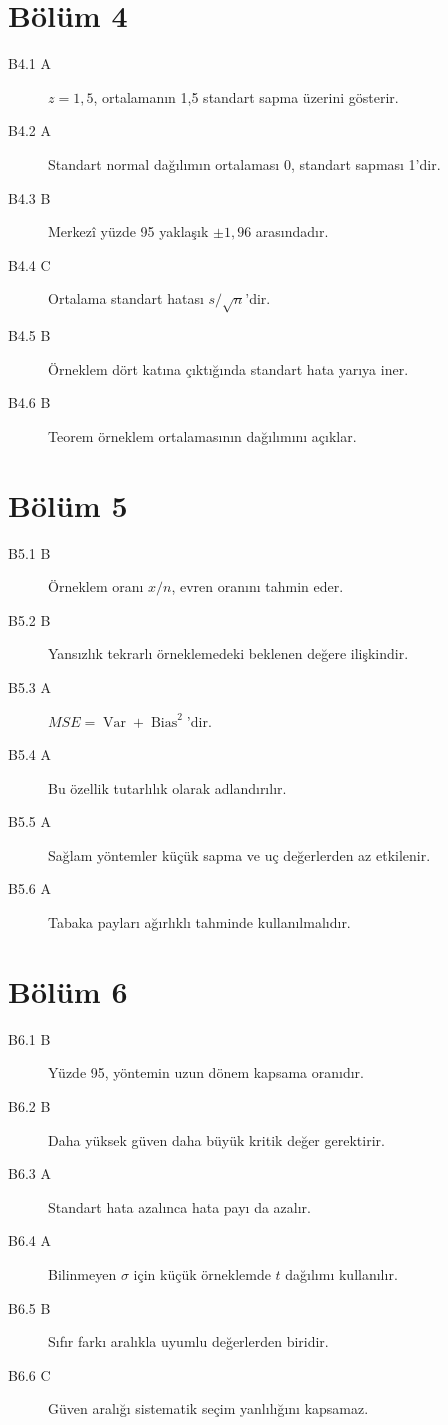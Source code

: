 \section*{Bölüm 4}
\begin{description}
\item[B4.1 A] $z=1{,}5$, ortalamanın 1,5 standart sapma üzerini gösterir.
\item[B4.2 A] Standart normal dağılımın ortalaması 0, standart sapması 1'dir.
\item[B4.3 B] Merkezî yüzde 95 yaklaşık $\pm1{,}96$ arasındadır.
\item[B4.4 C] Ortalama standart hatası $s/\sqrt n$'dir.
\item[B4.5 B] Örneklem dört katına çıktığında standart hata yarıya iner.
\item[B4.6 B] Teorem örneklem ortalamasının dağılımını açıklar.
\end{description}

\section*{Bölüm 5}
\begin{description}
\item[B5.1 B] Örneklem oranı $x/n$, evren oranını tahmin eder.
\item[B5.2 B] Yansızlık tekrarlı örneklemedeki beklenen değere ilişkindir.
\item[B5.3 A] $MSE=\operatorname{Var}+\operatorname{Bias}^2$'dir.
\item[B5.4 A] Bu özellik tutarlılık olarak adlandırılır.
\item[B5.5 A] Sağlam yöntemler küçük sapma ve uç değerlerden az etkilenir.
\item[B5.6 A] Tabaka payları ağırlıklı tahminde kullanılmalıdır.
\end{description}

\section*{Bölüm 6}
\begin{description}
\item[B6.1 B] Yüzde 95, yöntemin uzun dönem kapsama oranıdır.
\item[B6.2 B] Daha yüksek güven daha büyük kritik değer gerektirir.
\item[B6.3 A] Standart hata azalınca hata payı da azalır.
\item[B6.4 A] Bilinmeyen $\sigma$ için küçük örneklemde $t$ dağılımı kullanılır.
\item[B6.5 B] Sıfır farkı aralıkla uyumlu değerlerden biridir.
\item[B6.6 C] Güven aralığı sistematik seçim yanlılığını kapsamaz.
\end{description}

